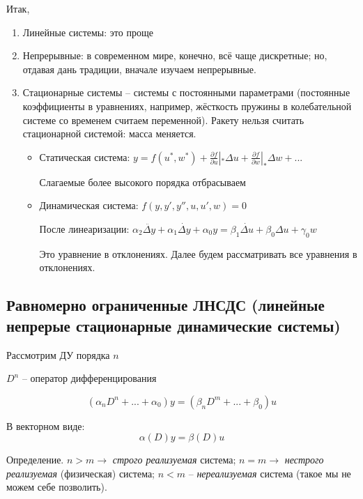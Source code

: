 \documentclass[main.tex]{subfiles}
\begin{document}
Итак,
\begin{enumerate}[noitemsep]
	\item Линейные системы: это проще
	\item Непрерывные: в современном мире, конечно, всё чаще дискретные; но, отдавая дань традиции, вначале изучаем непрерывные.
	\item Стационарные системы -- системы с постоянными параметрами (постоянные коэффициенты в уравнениях, например, жёсткость пружины в колебательной системе со временем считаем переменной).
	Ракету нельзя считать стационарной системой: масса меняется.
	
	\begin{itemize}[noitemsep]
		\item Статическая система: $ y = f(u^*, w^*) + \frac{\partial f}{\partial u} |_* \Delta u + \frac{\partial f}{\partial w} |_* \Delta w + ... $
		
		Слагаемые более высокого порядка отбрасываем
		
		\item Динамическая система: $ f(y, y', y'', u, u', w) = 0 $
		
		После линеаризации: $ \alpha_2 \ddot{\Delta y} + \alpha_1 \dot{\Delta y} + \alpha_0 y = \beta_1 \dot{\Delta u} + \beta_0 \Delta u + \gamma_0 w $
		
		Это уравнение в отклонениях. Далее будем рассматривать все уравнения в отклонениях.
	\end{itemize}

\end{enumerate}

\subsection{Равномерно ограниченные ЛНСДС (линейные непрерые стационарные динамические системы)}

Рассмотрим ДУ порядка $ n $

$ D^n $ -- оператор дифференцирования

\begin{equation}
	(\alpha_n D^n + ... + \alpha_0) y = (\beta_n D^m + ... + \beta_0) u
\end{equation}

В векторном виде:
\begin{equation}
	\alpha (D) y = \beta(D) u
\end{equation}

Определение. $ n > m \to $ \emph{строго реализуемая} система; $ n = m \to $ \emph{нестрого реализуемая} (физическая) система; $ n < m $ -- \emph{нереализуемая} система (такое мы не можем себе позволить).
\end{document}

